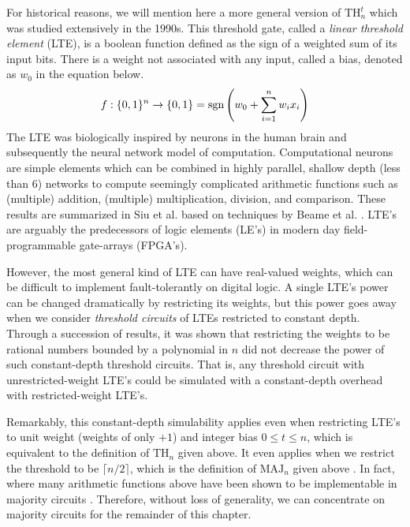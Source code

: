 For historical reasons, we will mention here a more general
version of $\text{TH}^t_n$ which was studied extensively in
the 1990s. This threshold gate, 
called a \emph{linear threshold element} (LTE), is a boolean
function defined as
the sign of a weighted sum of its input bits. There is a weight
not associated with any input, called a bias,
denoted as $w_0$ in the equation below.
%
\begin{equation}
f:\{0,1\}^n \rightarrow \{0,1\} = \text{sgn}\left( w_0 + \sum_{i=1}^n w_i x_i \right)
\end{equation}
%
The LTE was biologically inspired by neurons in the human brain and
subsequently the neural network model of computation. Computational
neurons are simple elements which can be combined in highly parallel,
shallow depth (less than $6$) networks to compute seemingly complicated
arithmetic functions such as (multiple) addition, (multiple) multiplication,
division, and comparison. These results are summarized in Siu et al. \cite{Siu1993}
based on techniques by Beame et al. \cite{Beame1986}. LTE's are arguably the
predecessors of logic elements (LE's) in modern day field-programmable
gate-arrays (FPGA's).

However, the most general kind of LTE can have real-valued weights,
which can be difficult to implement fault-tolerantly on digital logic.
A single LTE's power can be changed dramatically by restricting
its weights, but this power goes away when we consider \emph{threshold circuits}
of LTEs restricted to constant depth.
Through a succession of results, it was shown that restricting the weights
to be rational numbers bounded by a polynomial in $n$ \cite{Siu1991a}
did not decrease the power of such constant-depth threshold circuits.
That is, any threshold circuit with unrestricted-weight LTE's could be simulated
with a constant-depth overhead with restricted-weight LTE's.

Remarkably, this constant-depth simulability applies even when restricting
LTE's to unit weight (weights of only $+1$) and integer bias $0 \le t \le n$,
which is equivalent to the definition of $\text{TH}_n$ given above. It
even applies when we restrict the threshold to be $\lceil n/2 \rceil$, which
is the definition of $\text{MAJ}_n$ given above \cite{Goldmann1994}.
In fact, where many arithmetic functions above have been shown to
be implementable in majority circuits \cite{Reif1992,Yeh1996}.
Therefore, without loss of generality, we can concentrate on
majority circuits for the remainder of this chapter.

